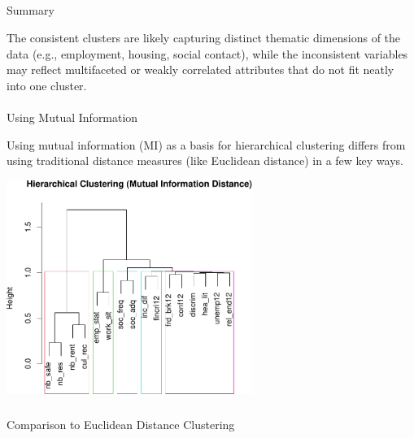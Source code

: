 \documentclass[
]{article}
\makeatletter
\let\oldparagraph\paragraph
\renewcommand{\paragraph}{
    \@ifstar
      \xxxParagraphStar
      \xxxParagraphNoStar
  }
\newcommand{\xxxParagraphStar}[1]{\oldparagraph*{#1}\mbox{}}
\newcommand{\xxxParagraphNoStar}[1]{\oldparagraph{#1}\mbox{}}
\let\oldsubparagraph\subparagraph
\renewcommand{\subparagraph}{
    \@ifstar
      \xxxSubParagraphStar
      \xxxSubParagraphNoStar
  }
\newcommand{\xxxSubParagraphStar}[1]{\oldsubparagraph*{#1}\mbox{}}
\newcommand{\xxxSubParagraphNoStar}[1]{\oldsubparagraph{#1}\mbox{}}
\makeatother
\begin{document}
\subparagraph{Summary}\label{summary-1}

The consistent clusters are likely capturing distinct thematic
dimensions of the data (e.g., employment, housing, social contact),
while the inconsistent variables may reflect multifaceted or weakly
correlated attributes that do not fit neatly into one cluster.

\paragraph{Using Mutual Information}\label{using-mutual-information}

Using mutual information (MI) as a basis for hierarchical clustering
differs from using traditional distance measures (like Euclidean
distance) in a few key ways.

\begin{center}
\includegraphics[width=0.6\textwidth,height=\textheight]{draft_v2_files/figure-pdf/unnamed-chunk-20-1.pdf}
\end{center}

\subparagraph{Comparison to Euclidean Distance
Clustering}\label{comparison-to-euclidean-distance-clustering}
\end{document}
